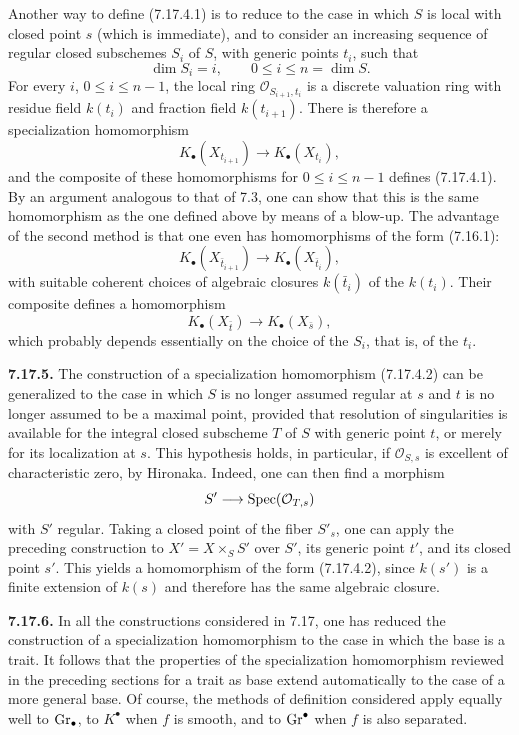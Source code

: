 Another way to define (7.17.4.1) is to reduce to the case in which $S$ is
local with closed point $s$ (which is immediate), and to consider an
increasing sequence of regular closed subschemes $S_i$ of $S$, with generic
points $t_i$, such that
\[
\dim S_i=i,\qquad 0\leq i\leq n=\dim S.
\]
For every $i$, $0\leq i\leq n-1$, the local ring
$\mathcal O_{S_{i+1},t_i}$ is a discrete valuation ring with residue field
$k(t_i)$ and fraction field $k(t_{i+1})$. There is therefore a
specialization homomorphism
\[
K_\bullet(X_{t_{i+1}})\longrightarrow K_\bullet(X_{t_i}),
\]
and the composite of these homomorphisms for $0\leq i\leq n-1$ defines
(7.17.4.1). By an argument analogous to that of 7.3, one can show that this
is the same homomorphism as the one defined above by means of a blow-up. The
advantage of the second method is that one even has homomorphisms of the
form (7.16.1):
\[
K_\bullet(X_{\bar t_{i+1}})\longrightarrow
K_\bullet(X_{\bar t_i}),
\]
with suitable coherent choices of algebraic closures $k(\bar t_i)$ of the
$k(t_i)$. Their composite defines a homomorphism
\begin{equation}\tag{7.17.4.2}
K_\bullet(X_{\bar t})\longrightarrow K_\bullet(X_{\bar s}),
\end{equation}
which probably depends essentially on the choice of the $S_i$, that is, of
the $t_i$.

\textbf{7.17.5.}
The construction of a specialization homomorphism (7.17.4.2) can be
generalized to the case in which $S$ is no longer assumed regular at $s$
and $t$ is no longer assumed to be a maximal point, provided that resolution
of singularities is available for the integral closed subscheme $T$ of $S$
with generic point $t$, or merely for its localization at $s$. This
hypothesis holds, in particular, if $\mathcal O_{S,s}$ is excellent of
characteristic zero, by Hironaka. Indeed, one can then find a morphism
\[
S'\longrightarrow\operatorname{Spec}(\mathcal O_{T,s})
\]
with $S'$ regular. Taking a closed point of the fiber $S'_s$, one can apply
the preceding construction to $X'=X\times_SS'$ over $S'$, its generic point
$t'$, and its closed point $s'$. This yields a homomorphism of the form
(7.17.4.2), since $k(s')$ is a finite extension of $k(s)$ and therefore has
the same algebraic closure.

\textbf{7.17.6.}
In all the constructions considered in 7.17, one has reduced the
construction of a specialization homomorphism to the
case in which the base is a trait. It follows that the properties of the
specialization homomorphism reviewed in the preceding sections for a trait
as base extend automatically to the case of a more general base. Of course,
the methods of definition considered apply equally well to $\operatorname{Gr}_\bullet$,
to $K^\bullet$ when $f$ is smooth, and to $\operatorname{Gr}^\bullet$ when $f$ is also
separated.


